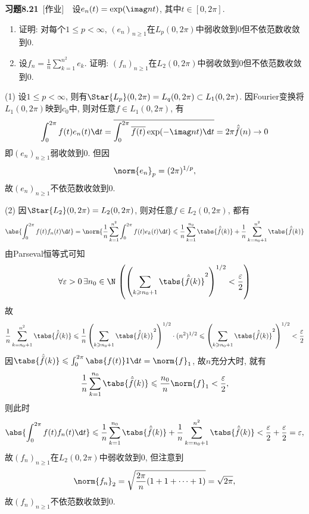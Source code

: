 	\textbf{习题8.21}\ [作业]\ \ 设$ e_n(t)=\exp(\imag nt) $, 其中$ t\in[0,2\pi] $.
	\begin{enumerate}
	\item 证明: 对每个$ 1\leqslant p<\infty $, $ (e_n)_{n\geqslant 1} $在$ L_p(0,2\pi) $中弱收敛到0但不依范数收敛到0.
	\item 设$ f_n=\frac{1}{n}\sum\limits_{k=1}^{n^2}e_k $. 证明: $ (f_n)_{n\geqslant 1} $在$ L_2(0,2\pi) $中弱收敛到0但不依范数收敛到0.
	\end{enumerate}
	\begin{answer}
	(1) 设$ 1\leqslant p<\infty $, 则有$ \Star{L_p}(0,2\pi)=L_q(0,2\pi)\subset L_1(0,2\pi) $. 因Fourier变换将$ L_1(0,2\pi) $映到$ c_0 $中, 则对任意$ f\in L_1(0,2\pi) $, 有
	\[
	\int_0^{2\pi}f(t)e_n(t)\d  t=\overline{\int_0^{2\pi}\overline{f(t)}\exp(-\imag nt)\d  t}=2\pi\hat{\bar{f}}(n)\to 0
	\]
	即$ (e_n)_{n\geqslant 1} $弱收敛到0. 但因
	\[
	\norm{e_n}_p=(2\pi)^{1/p},
	\]
	故$ (e_n)_{n\geqslant 1} $不依范数收敛到0.
	
	(2) 因$ \Star{L_2}(0,2\pi)=L_2(0,2\pi) $, 则对任意$ f\in L_2(0,2\pi) $, 都有
	\[
	\begin{aligned}
	\abs{\int_0^{2\pi}f(t)f_n(t)\d  t}=\norm{\frac{1}{n}\sum_{k=1}^{n^2}\int_0^{2\pi}f(t)e_k(t)\d  t}\leqslant\frac{1}{n}\sum_{k=1}^{n_0}\tabs{\hat{\bar{f}}(k)}+\frac{1}{n}\sum_{k=n_0+1}^{n^2}\tabs{\hat{\bar{f}}(k)}
	\end{aligned}
	\]
	由Parseval恒等式可知
	\[
	\forall\varepsilon>0\,\exists n_0\in\N\,\left( \left(\sum_{k\geqslant n_0+1}\tabs{\hat{\bar{f}}(k)}^2\right)^{1/2}<\frac{\varepsilon}{2} \right)
	\]
	故
	\[
	\frac{1}{n}\sum_{k=n_0+1}^{n^2}\tabs{\hat{\bar{f}}(k)}\leqslant\frac{1}{n}\left(\sum_{k\geqslant n_0+1}\tabs{\hat{\bar{f}}(k)}^2\right)^{1/2}\cdot(n^2)^{1/2}\leqslant\left(\sum_{k\geqslant n_0+1}\tabs{\hat{\bar{f}}(k)}^2\right)^{1/2}<\frac{\varepsilon}{2}
	\]
	因$ \tabs{\hat{\bar{f}}(k)}\leqslant\int_0^{2\pi}\abs{f(t)}1\d  t=\norm{f}_1 $, 故$ n $充分大时, 就有
	\[
	\frac{1}{n}\sum_{k=1}^{n_0}\tabs{\hat{\bar{f}}(k)}\leqslant\frac{n_0}{n}\norm{f}_1<\frac{\varepsilon}{2},
	\]
	则此时
	\[
	\abs{\int_0^{2\pi}f(t)f_n(t)\d  t}\leqslant\frac{1}{n}\sum_{k=1}^{n_0}\tabs{\hat{\bar{f}}(k)}+\frac{1}{n}\sum_{k=n_0+1}^{n^2}\tabs{\hat{\bar{f}}(k)}<\frac{\varepsilon}{2}+\frac{\varepsilon}{2}=\varepsilon,
	\]
	故$ (f_n)_{n\geqslant 1} $在$ L_2(0,2\pi) $中弱收敛到0, 但注意到
	\[
	\norm{f_n}_2=\sqrt{\frac{2\pi}{n}(1+1+\cdots+1)}=\sqrt{2\pi},
	\]
	故$ (f_n)_{n\geqslant 1} $不依范数收敛到0.\qedhere
	\end{answer}

